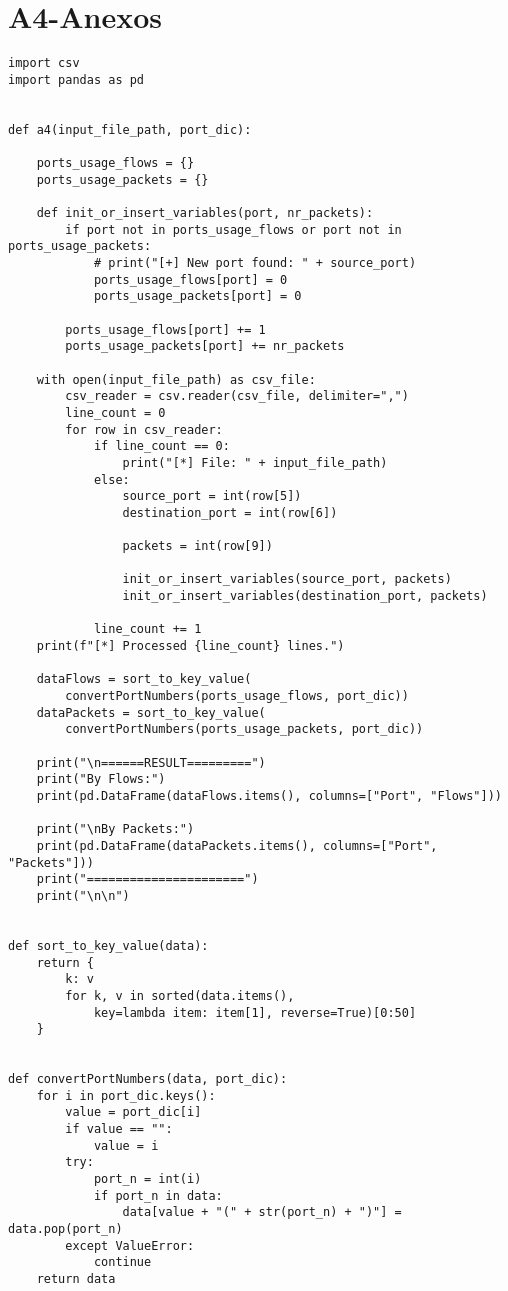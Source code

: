 \chapter{A4-Anexos}
\begin{lstlisting}
import csv
import pandas as pd


def a4(input_file_path, port_dic):

    ports_usage_flows = {}
    ports_usage_packets = {}

    def init_or_insert_variables(port, nr_packets):
        if port not in ports_usage_flows or port not in ports_usage_packets:
            # print("[+] New port found: " + source_port)
            ports_usage_flows[port] = 0
            ports_usage_packets[port] = 0

        ports_usage_flows[port] += 1
        ports_usage_packets[port] += nr_packets

    with open(input_file_path) as csv_file:
        csv_reader = csv.reader(csv_file, delimiter=",")
        line_count = 0
        for row in csv_reader:
            if line_count == 0:
                print("[*] File: " + input_file_path)
            else:
                source_port = int(row[5])
                destination_port = int(row[6])

                packets = int(row[9])

                init_or_insert_variables(source_port, packets)
                init_or_insert_variables(destination_port, packets)

            line_count += 1
    print(f"[*] Processed {line_count} lines.")

    dataFlows = sort_to_key_value(
        convertPortNumbers(ports_usage_flows, port_dic))
    dataPackets = sort_to_key_value(
        convertPortNumbers(ports_usage_packets, port_dic))

    print("\n======RESULT=========")
    print("By Flows:")
    print(pd.DataFrame(dataFlows.items(), columns=["Port", "Flows"]))

    print("\nBy Packets:")
    print(pd.DataFrame(dataPackets.items(), columns=["Port", "Packets"]))
    print("======================")
    print("\n\n")


def sort_to_key_value(data):
    return {
        k: v
        for k, v in sorted(data.items(), 
            key=lambda item: item[1], reverse=True)[0:50]
    }


def convertPortNumbers(data, port_dic):
    for i in port_dic.keys():
        value = port_dic[i]
        if value == "":
            value = i
        try:
            port_n = int(i)
            if port_n in data:
                data[value + "(" + str(port_n) + ")"] = data.pop(port_n)
        except ValueError:
            continue
    return data



\end{lstlisting}
